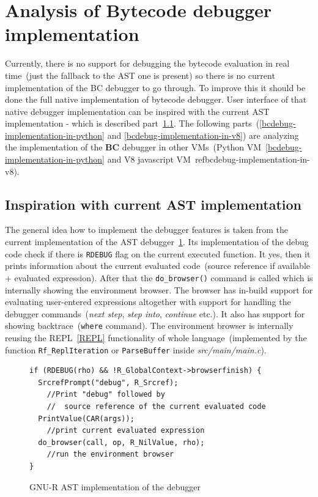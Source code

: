 \documentclass[thesis=M,english]{FITthesis}[2018/10/20]
\newcommand{\code}[1]{\texttt{#1}}
\begin{document}
\section{Analysis of Bytecode debugger implementation}\label{analysis-of-debugger}

Currently, there is no support for debugging the bytecode evaluation in real time~(just the fallback to the AST one is present) so there is no current implementation of the BC debugger to go through. To improve this it should be done the full native implementation of bytecode debugger. User interface of that native debugger implementation can be inspired with the current AST implementation - which is described part~\ref{inspiration-with-current-implementation}. The following parts~(\ref{bcdebug-implementation-in-python} and \ref{bcdebug-implementation-in-v8}) are analyzing the implementation of the \textbf{BC} debugger in other VMs~(Python VM~\ref{bcdebug-implementation-in-python} and V8 javascript VM~ref{bcdebug-implementation-in-v8}).

\subsection{Inspiration with current AST implementation}\label{inspiration-with-current-implementation}

The general idea how to implement the debugger features is taken from the current implementation of the AST debugger~\ref{fig:ast-implementation-of-debugger}. Its implementation of the debug code check if there is \code{RDEBUG} flag on the current executed function. It yes, then it prints information about the current evaluated code~(source reference if available + evaluated expression). After that the \code{do{\_}browser()} command is called which is internally showing the environment browser. The browser has in-build support for evaluating user-entered expressions altogether with support for handling the debugger commands~(\textit{next step}, \textit{step into}, \textit{continue} etc.). It also has support for showing backtrace~(\code{where} command). The environment browser is internally reusing the REPL~\ref{REPL} functionality of whole language~(implemented by the function \code{Rf{\_}ReplIteration} or \code{ParseBuffer} inside \textit{src/main/main.c}).

\begin{figure}[!h]
\begin{lstlisting}
if (RDEBUG(rho) && !R_GlobalContext->browserfinish) {
  SrcrefPrompt("debug", R_Srcref);
    //Print "debug" followed by
    //  source reference of the current evaluated code
  PrintValue(CAR(args));
  	//print current evaluated expression
  do_browser(call, op, R_NilValue, rho);
  	//run the environment browser
}
\end{lstlisting}
	\caption{GNU-R AST implementation of the debugger}\label{fig:ast-implementation-of-debugger}
\end{figure}
\end{document}

